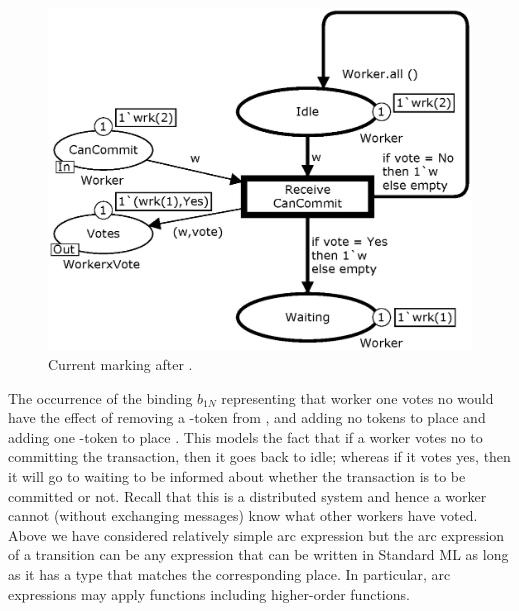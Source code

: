 \begin{figure}[h]
\centering
\includegraphics[scale=.5]{figures/ReceiveCanCommit.eps}
\caption{Current marking after .}
\label{fig:receivecancommit}
\end{figure}

The occurrence of the binding $b_{1N}$ representing that worker one
votes no would have the effect of removing a -token
from , and adding no tokens to place 
and adding one -token to place . This
models the fact that if a worker votes no to committing the
transaction, then it goes back to idle; whereas if it votes yes, then
it will go to waiting to be informed about whether the transaction is
to be committed or not.  Recall that this is a distributed system and
hence a worker cannot (without exchanging messages) know what other
workers have voted.  Above we have considered relatively simple arc
expression but the arc expression of a transition can be any
expression that can be written in Standard ML as long as it has a type
that matches the corresponding place. In particular, arc expressions
may apply functions including higher-order functions.

